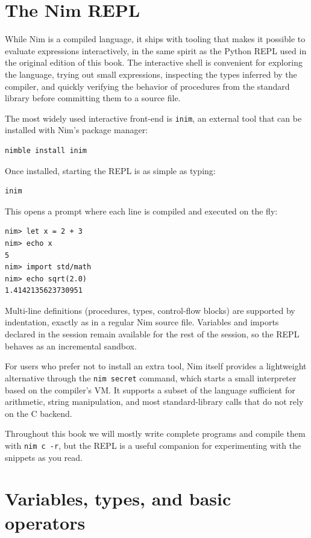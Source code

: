 \documentclass[justified, sixbynine]{tufte-book}
\def\ft{\small\tt}
\theoremstyle{plain}%
\newtheorem * {corollary}{Corollary}
\theoremstyle{definition}
\theoremstyle{remark}
\newtheorem * {remark}{Remark}
\newtheorem * {note}{Note}
\begin{document}
\begin{fullwidth}
\goodbreak\section{The Nim REPL}

While Nim is a compiled language, it ships with tooling that makes it possible to evaluate expressions interactively, in the same spirit as the Python REPL used in the original edition of this book. The interactive shell is convenient for exploring the language, trying out small expressions, inspecting the types inferred by the compiler, and quickly verifying the behavior of procedures from the standard library before committing them to a source file.

The most widely used interactive front-end is {\ft inim}, an external tool that can be installed with Nim's package manager:
\begin{lstlisting}
nimble install inim
\end{lstlisting}

Once installed, starting the REPL is as simple as typing:
\begin{lstlisting}
inim
\end{lstlisting}

This opens a prompt where each line is compiled and executed on the fly:
\begin{lstlisting}
nim> let x = 2 + 3
nim> echo x
5
nim> import std/math
nim> echo sqrt(2.0)
1.4142135623730951
\end{lstlisting}

Multi-line definitions (procedures, types, control-flow blocks) are supported by indentation, exactly as in a regular Nim source file. Variables and imports declared in the session remain available for the rest of the session, so the REPL behaves as an incremental sandbox.

For users who prefer not to install an extra tool, Nim itself provides a lightweight alternative through the {\ft nim secret} command, which starts a small interpreter based on the compiler's VM. It supports a subset of the language sufficient for arithmetic, string manipulation, and most standard-library calls that do not rely on the C backend.

Throughout this book we will mostly write complete programs and compile them with {\ft nim c -r}, but the REPL is a useful companion for experimenting with the snippets as you read.

\goodbreak\section{Variables, types, and basic operators}


\end{fullwidth}
\end{document}
